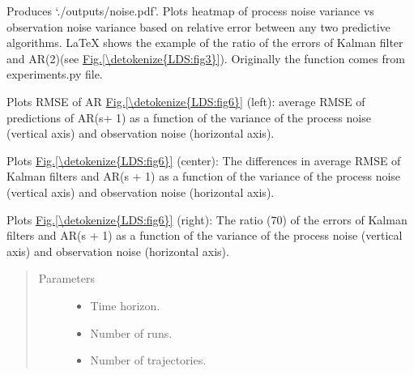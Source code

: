 \documentclass[letterpaper,10pt,english]{sphinxmanual}
\begin{document}

\begin{fulllineitems}
\label{\detokenize{LDS:LDS.OnlineLDS_library.testNoiseImpact}}
\sphinxAtStartPar
Produces ‘./outputs/noise.pdf’. Plots heatmap of process noise variance
vs observation noise variance based on relative error between any two
predictive algorithms. LaTeX shows the example of the ratio of the errors
of Kalman filter and AR(2)(see \hyperref[\detokenize{LDS:fig3}]{Fig.\@ \ref{\detokenize{LDS:fig3}}}).
Originally the function comes from experiments.py file.

\sphinxAtStartPar
Plots RMSE of AR \hyperref[\detokenize{LDS:fig6}]{Fig.\@ \ref{\detokenize{LDS:fig6}}} (left):
average RMSE of predictions of AR(s+ 1) as a function of the variance of the
process noise (vertical axis) and observation noise (horizontal axis).

\sphinxAtStartPar
Plots \hyperref[\detokenize{LDS:fig6}]{Fig.\@ \ref{\detokenize{LDS:fig6}}} (center):
The differences in average RMSE of Kalman filters and AR(s + 1) as a function
of the variance of the process noise (vertical axis) and observation noise (horizontal axis).

\sphinxAtStartPar
Plots \hyperref[\detokenize{LDS:fig6}]{Fig.\@ \ref{\detokenize{LDS:fig6}}} (right):
The ratio (70) of the errors of Kalman filters and AR(s + 1) as a function of
the variance of the process noise (vertical axis) and observation noise (horizontal axis).
\begin{quote}\begin{description}
\item[{Parameters}] \leavevmode\begin{itemize}
\item {} 
\sphinxAtStartPar
{} \textendash{} Time horizon.

\item {} 
\sphinxAtStartPar
{} \textendash{} Number of runs.

\item {} 
\sphinxAtStartPar
{} \textendash{} Number of trajectories.

\end{itemize}

\end{description}\end{quote}

\end{fulllineitems}
\end{document}
